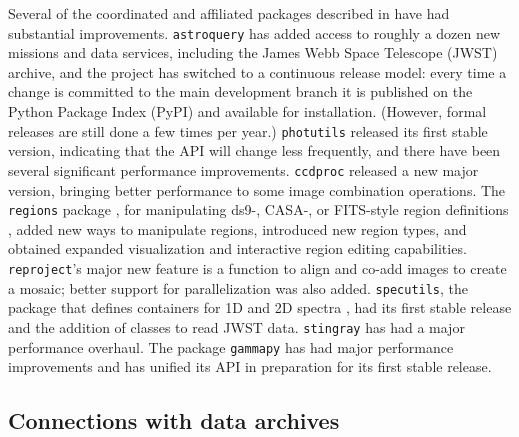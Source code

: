 \documentclass[modern]{aastex631}
\newcommand{\secauthor}[1]{{\color{blue}Author:~\textit{#1}}}
\begin{document}
Several of the coordinated and affiliated packages described in
\cite{astropy:2018} have had substantial improvements. \texttt{astroquery}
\citep{astroquery} has added access to roughly a dozen new missions and data
services, including the James Webb Space Telescope (JWST) archive, and the
project has switched to a continuous release model: every time a change is
committed to the main development branch it is published on the Python Package
Index (PyPI) and available for installation. (However, formal releases are still
done a few times per year.) \texttt{photutils} \citep{photutils} released its
first stable version, indicating that the API will change less frequently, and
there have been several significant performance improvements. \texttt{ccdproc}
\citep{ccdproc}  released a new major version, bringing better performance to
some image combination operations. The \texttt{regions} package
\citep{pyregions}, for manipulating ds9-, CASA-, or FITS-style region definitions \citep{ds9},
added new ways to manipulate regions, introduced new region types, and obtained
expanded visualization and interactive region editing capabilities.
\texttt{reproject}'s \citep{reproject} major new feature is a function to align
and co-add images to create a mosaic; better support for parallelization was
also added. \texttt{specutils}, the package that defines containers for 1D and
2D spectra \citep{specutils},  had its first stable release and the addition
of classes to read JWST data. \texttt{stingray} has had a major performance
overhaul. The package \texttt{gammapy} \citep{gammapy} has had major performance
improvements and has unified its API in preparation for its first stable
release.

\subsection{Connections with data archives}
\label{sec:astroquery}

\end{document}
